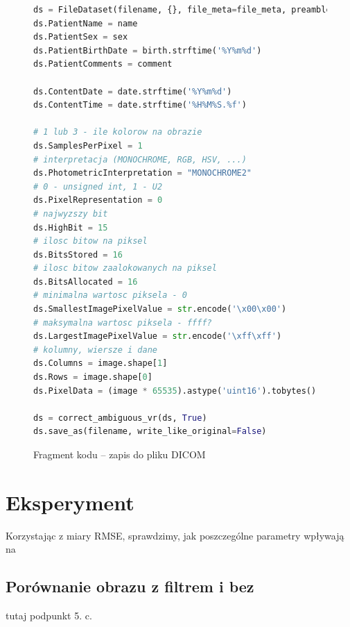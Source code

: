 \documentclass[polish,polish,a4paper]{article}
\begin{document}
			\begin{figure}[!h]
				\centering
				\begin{lstlisting}[language=Python, frame=single]
ds = FileDataset(filename, {}, file_meta=file_meta, preamble=b"\0" * 128)
ds.PatientName = name
ds.PatientSex = sex
ds.PatientBirthDate = birth.strftime('%Y%m%d')
ds.PatientComments = comment

ds.ContentDate = date.strftime('%Y%m%d')
ds.ContentTime = date.strftime('%H%M%S.%f')

# 1 lub 3 - ile kolorow na obrazie
ds.SamplesPerPixel = 1
# interpretacja (MONOCHROME, RGB, HSV, ...)
ds.PhotometricInterpretation = "MONOCHROME2"
# 0 - unsigned int, 1 - U2
ds.PixelRepresentation = 0
# najwyzszy bit
ds.HighBit = 15
# ilosc bitow na piksel
ds.BitsStored = 16
# ilosc bitow zaalokowanych na piksel
ds.BitsAllocated = 16
# minimalna wartosc piksela - 0
ds.SmallestImagePixelValue = str.encode('\x00\x00')
# maksymalna wartosc piksela - ffff?
ds.LargestImagePixelValue = str.encode('\xff\xff')
# kolumny, wiersze i dane
ds.Columns = image.shape[1]
ds.Rows = image.shape[0]
ds.PixelData = (image * 65535).astype('uint16').tobytes()

ds = correct_ambiguous_vr(ds, True)
ds.save_as(filename, write_like_original=False)
				\end{lstlisting}
				\caption{Fragment kodu -- zapis do pliku DICOM}
				\label{dicomsave}
			\end{figure}
			
	\section{Eksperyment}
		Korzystając z miary RMSE, sprawdzimy, jak poszczególne parametry wpływają na 
		
		\subsection{Porównanie obrazu z filtrem i bez}
			{\color{red} tutaj podpunkt 5. c.}
\end{document}
